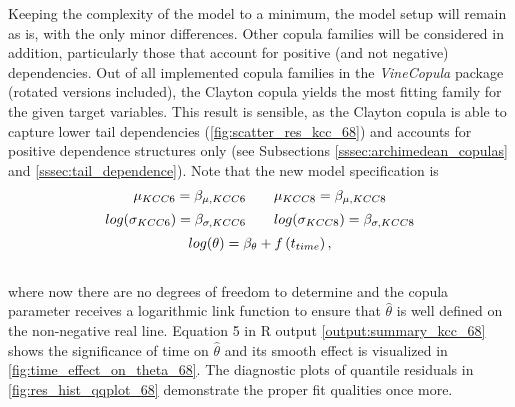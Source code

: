Keeping the complexity of the model to a minimum, the model setup will remain as is, with the only minor differences. Other copula families will be considered in addition, particularly those that account for positive (and not negative) dependencies. Out of all implemented copula families in the \textit{VineCopula} package (rotated versions included), the Clayton copula yields the most fitting family for the given target variables. This result is sensible, as the Clayton copula is able to capture lower tail dependencies (\autoref{fig:scatter_res_kcc_68}) and accounts for positive dependence structures only (see Subsections \ref{sssec:archimedean_copulas} and \ref{sssec:tail_dependence}). Note that the new model specification is \\

\begin{equation}
\begin{array}{c}
\mu_{KCC 6}=\beta_{\mu,KCC6} \qquad \mu_{KCC 8}=\beta_{\mu,KCC8}  \\  \noalign{\vskip5pt}

log(\sigma_{KCC 6})=\beta_{\sigma,KCC6} \qquad log(\sigma_{KCC 8})=\beta_{\sigma,KCC8} \\  \noalign{\vskip5pt}


log(\theta)=\beta_{\theta}+f\left(t_{time}\right),
\end{array}
\label{eq:gjrm_formula_68}
\end{equation}
\\

where now there are no degrees of freedom to determine and the copula parameter receives a logarithmic link function to ensure that $\hat{\theta}$ is well defined on the non-negative real line. Equation 5 in R output \ref{output:summary_kcc_68} shows the significance of time on $\hat{\theta}$ and its smooth effect is visualized in \autoref{fig:time_effect_on_theta_68}. The diagnostic plots of quantile residuals in \autoref{fig:res_hist_qqplot_68} demonstrate the proper fit qualities once more.
\\




